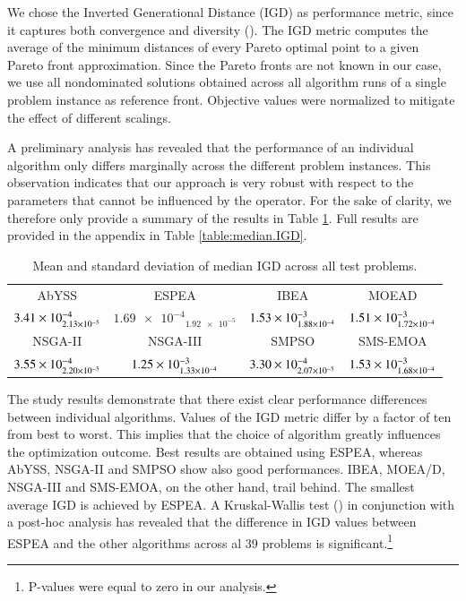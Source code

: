 We chose the Inverted Generational Distance (IGD) as performance metric, since it captures both convergence and diversity (\cite{van1998evolutionary}). The IGD metric computes the average of the minimum distances of every Pareto optimal point to a given Pareto front approximation. Since the Pareto fronts are not known in our case, we use all nondominated solutions obtained across all algorithm runs of a single problem instance as reference front. Objective values were normalized to mitigate the effect of different scalings.

A preliminary analysis has revealed that the performance of an individual algorithm only differs marginally across the different problem instances. This observation indicates that our approach is very robust with respect to the parameters that cannot be influenced by the operator. For the sake of clarity, we therefore only provide a summary of the results in Table \ref{tbl:summary}. Full results are provided in the appendix in Table \ref{table:median.IGD}.

\begin{table}
\caption{Mean and standard deviation of median IGD across all test problems.}
\label{tbl:summary}
\centering
\begin{tabular}{*{4}{c}} \toprule
AbYSS & ESPEA & IBEA & MOEAD\\ \cmidrule(lr){1-1} \cmidrule(lr){2-2} \cmidrule(lr){3-3} \cmidrule(lr){4-4}
$\num{3.41E-4}_{\num{2.13E-5}}$ & $\num{1.69e-4}_{\num{1.92e-5}}$ & $\num{1.53E-3}_{\num{1.88E-4}}$ & $\num{1.51E-3}_{\num{1.72E-4}}$ \\ \midrule
NSGA-II & NSGA-III & SMPSO & SMS-EMOA \\ \cmidrule(lr){1-1} \cmidrule(lr){2-2} \cmidrule(lr){3-3} \cmidrule(lr){4-4}
$\num{3.55E-4}_{\num{2.20E-5}}$ & $\num{1.25E-3}_{\num{1.33E-4}}$ & $\num{3.30E-4}_{\num{2.07E-5}}$ & $\num{1.53E-3}_{\num{1.68E-4}}$ \\
\bottomrule
\end{tabular}
\end{table}

The study results demonstrate that there exist clear performance differences between individual algorithms. Values of the IGD metric differ by a factor of ten from best to worst. This implies that the choice of algorithm greatly influences the optimization outcome. Best results are obtained using ESPEA, whereas AbYSS, NSGA-II and SMPSO show also good performances. IBEA, MOEA/D, NSGA-III and SMS-EMOA, on the other hand, trail behind. The smallest average IGD is achieved by ESPEA. A Kruskal-Wallis test (\cite{kruskal1952use}) in conjunction with a post-hoc analysis has revealed that the difference in IGD values between ESPEA and the other algorithms across al 39 problems is significant.\footnote{P-values were equal to zero in our analysis.}

